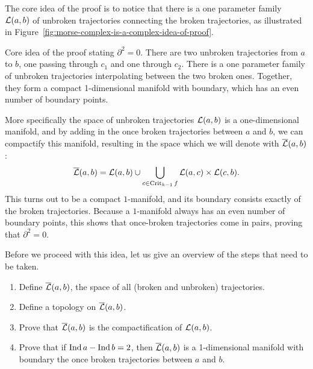 The core idea of the proof is to notice that there is a one parameter family $\mathcal L(a, b)$ of unbroken trajectories connecting the broken trajectories, as illustrated in Figure~\ref{fig:morse-complex-is-a-complex-idea-of-proof}.
\begin{marginfigure}
    \centering
    \caption{
        Core idea of the proof stating $\partial^2 = 0$.
        There are two unbroken trajectories from $a$ to $b$, one passing through $c_1$ and one through $c_2$.
        There is a one parameter family of unbroken trajectories interpolating between the two broken ones.
        Together, they form a compact 1-dimensional manifold with boundary, which has an even number of boundary points.
    }
    \label{fig:morse-complex-is-a-complex-idea-of-proof}
\end{marginfigure}
More specifically the space of unbroken trajectories $\mathcal L(a, b) $ is a one-dimensional manifold, and by adding in the once broken trajectories between $a$ and $b$, we can compactify this manifold, resulting in the space which we will denote with $\overline{\mathcal L}(a, b)$:
\[
\overline{\mathcal L}(a, b) = \mathcal L(a, b) \cup \bigcup_{c \in \operatorname{Crit}_{k-1} f} \mathcal L(a, c) \times \mathcal L(c, b)
.\] 
This turns out to be a compact $1$-manifold, and its boundary consists exactly of the broken trajectories.
Because a $1$-manifold always has an even number of boundary points, this shows that once-broken trajectories come in pairs, proving that  $\partial^2 = 0$.

Before we proceed with this idea, let us give an overview of the steps that need to be taken.

\begin{enumerate}
    \item Define $\overline{\mathcal L}(a, b)$, the space of all (broken and unbroken) trajectories.
    \item Define a topology on $\overline{\mathcal L}(a, b)$.
    \item Prove that  $\overline{\mathcal L}(a, b)$ is the compactification of $\mathcal L(a, b)$.
    \item Prove that if $\operatorname{Ind} a - \operatorname{Ind} b = 2$, then $\overline{\mathcal L}(a, b)$ is a 1-dimensional manifold with boundary the once broken trajectories between $a$ and  $b$.
\end{enumerate}

